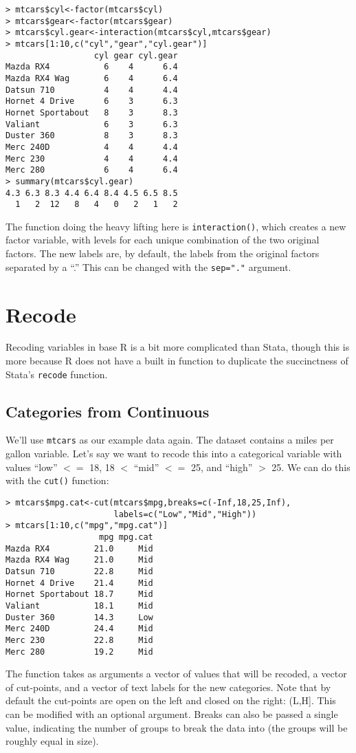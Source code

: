 \documentclass[12pt, oneside]{amsart}   	%
\begin{document}
\begin{verbatim}
> mtcars$cyl<-factor(mtcars$cyl)
> mtcars$gear<-factor(mtcars$gear)
> mtcars$cyl.gear<-interaction(mtcars$cyl,mtcars$gear)
> mtcars[1:10,c("cyl","gear","cyl.gear")]
                  cyl gear cyl.gear
Mazda RX4           6    4      6.4
Mazda RX4 Wag       6    4      6.4
Datsun 710          4    4      4.4
Hornet 4 Drive      6    3      6.3
Hornet Sportabout   8    3      8.3
Valiant             6    3      6.3
Duster 360          8    3      8.3
Merc 240D           4    4      4.4
Merc 230            4    4      4.4
Merc 280            6    4      6.4
> summary(mtcars$cyl.gear)
4.3 6.3 8.3 4.4 6.4 8.4 4.5 6.5 8.5 
  1   2  12   8   4   0   2   1   2 
\end{verbatim}

The function doing the heavy lifting here is \texttt{interaction()}, which creates a new factor variable, with levels for each unique combination of the two original factors. The new labels are, by default, the labels from the original factors separated by a ``.'' This can be changed with the \texttt{sep="."} argument. 

\section{Recode}

Recoding variables in base R is a bit more complicated than Stata, though this is more because R does not have a built in function to duplicate the succinctness of Stata's \texttt{recode} function. 


\subsection{Categories from Continuous}

We'll use \texttt{mtcars} as our example data again. The dataset contains a miles per gallon variable. Let's say we want to recode this into a categorical variable with values ``low'' $<=$ 18,  18 $<$ ``mid'' $<=$ 25, and ``high'' $>$ 25. We can do this with the \texttt{cut()} function:

\begin{verbatim}
> mtcars$mpg.cat<-cut(mtcars$mpg,breaks=c(-Inf,18,25,Inf),
					  labels=c("Low","Mid","High"))
> mtcars[1:10,c("mpg","mpg.cat")]
                   mpg mpg.cat
Mazda RX4         21.0     Mid
Mazda RX4 Wag     21.0     Mid
Datsun 710        22.8     Mid
Hornet 4 Drive    21.4     Mid
Hornet Sportabout 18.7     Mid
Valiant           18.1     Mid
Duster 360        14.3     Low
Merc 240D         24.4     Mid
Merc 230          22.8     Mid
Merc 280          19.2     Mid
\end{verbatim}

The function takes as arguments a vector of values that will be recoded, a vector of cut-points, and a vector of text labels for the new categories. Note that by default the cut-points are open on the left and closed on the right: (L,H]. This can be modified with an optional argument. Breaks can also be passed a single value, indicating the number of groups to break the data into (the groups will be roughly equal in size). 
\end{document}
